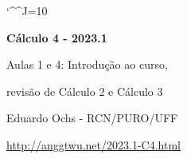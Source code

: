\documentclass[oneside,12pt]{article}
\begin{document}
\catcode`\^^J=10
\def\Caurl   #1{\expr{Caurl("#1")}}
\def\Cahref#1#2{\href{\Caurl{#1}}{#2}}
\def\Ca      #1{\Cahref{#1}{#1}}
\pu
\pu
\def\pictgridstyle{\color{GrayPale}\linethickness{0.3pt}}
\def\pictaxesstyle{\linethickness{0.5pt}}
\def\pictnaxesstyle{\color{GrayPale}\linethickness{0.5pt}}
\celllower=2.5pt




\def\u#1{\par{\footnotesize \url{#1}}}

\def\drafturl{http://anggtwu.net/LATEX/2023-1-C4.pdf}
\def\drafturl{http://anggtwu.net/2023.1-C4.html}
\def\draftfooter{\tiny \href{\drafturl}{\jobname{}} \ColorBrown{\shorttoday{} \hours}}



%

\thispagestyle{empty}

\begin{center}

\vspace*{1.2cm}

{\bf \Large Cálculo 4 - 2023.1}

\bsk

Aulas 1 e 4: Introdução ao curso,

revisão de Cálculo 2 e Cálculo 3

\bsk

Eduardo Ochs - RCN/PURO/UFF

\url{http://anggtwu.net/2023.1-C4.html}

\end{center}
\end{document}
